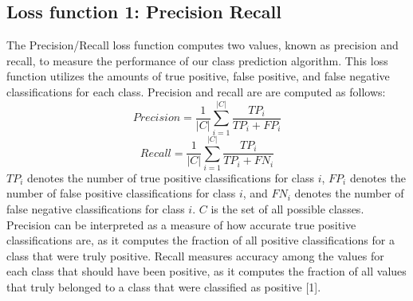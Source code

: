 \documentclass[twoside,11pt]{article}
\begin{document}
\subsection{Loss function 1: Precision Recall}
The Precision/Recall loss function computes two values, known as precision and recall, to measure the performance of our class prediction algorithm. This loss function utilizes the amounts of true positive, false positive, and false negative classifications for each class. Precision and recall are are computed as follows: 
$$Precision = \frac{1}{|C|} \sum^{|C|}_{i=1} \frac{TP_i}{TP_i + FP_i}$$
$$Recall = \frac{1}{|C|} \sum^{|C|}_{i=1} \frac{TP_i}{TP_i + FN_i}$$
$TP_i$ denotes the number of true positive classifications for class $i$, $FP_i$ denotes the number of false positive classifications for class $i$, and $FN_i$ denotes the number of false negative classifications for class $i$. $C$ is the set of all possible classes. Precision can be interpreted as a measure of how accurate true positive classifications are, as it computes the fraction of all positive classifications for a class that were truly positive. Recall measures accuracy among the values for each class that should have been positive, as it computes the fraction of all values that truly belonged to a class that were classified as positive [1]. \\ \\
\end{document}
